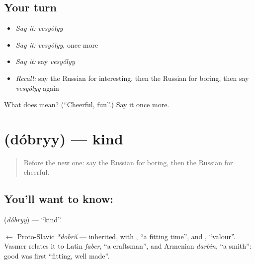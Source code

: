 \subsection*{Your turn}
\begin{itemize}
\raggedright
  \item \emph{Say it:} \emph{vesyólyy}
  \item \emph{Say it:} \emph{vesyólyy}, once more
  \item \emph{Say it:} say \emph{vesyólyy}
  \item \emph{Recall:} say the Russian for interesting, then the Russian for boring, then say \emph{vesyólyy} again
\end{itemize}

\begin{tcolorbox}[breakable,colback=teal!4,colframe=teal!35!black,title={Before you move on}]
What does  mean? (\textquotedblleft{}Cheerful, fun\textquotedblright{}.) Say it once more.
\end{tcolorbox}
\section[\texorpdfstring{\ru{добрый} (dóbryy)}{добрый (dóbryy)}]{ (dóbryy) — kind}

\label{lesson:RU-C127-kind}



\begin{quote}
Before the new one: say the Russian for boring, then the Russian for cheerful.
\end{quote}

\subsection*{You'll want to know: }
\textbf{} (\emph{dóbryy}) — \textquotedblleft{}kind\textquotedblright{}.

\begin{cousinweb}
\textbf{} $\leftarrow$ Proto-Slavic \emph{*dobrŭ} — inherited, with \emph{}, \textquotedblleft{}a fitting time\textquotedblright{}, and \emph{}, \textquotedblleft{}valour\textquotedblright{}. Vasmer relates it to Latin \emph{faber}, \textquotedblleft{}a craftsman\textquotedblright{}, and Armenian \emph{darbin}, \textquotedblleft{}a smith\textquotedblright{}: good was first \textquotedblleft{}fitting, well made\textquotedblright{}.
\end{cousinweb}

